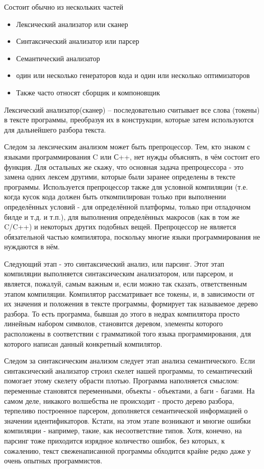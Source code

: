 \documentclass{article}
\begin{document}
Состоит обычно из нескольких частей

\begin{itemize}
    \item Лексический анализатор или сканер
    \item Синтаксический анализатор или парсер
    \item Семантический анализатор
    \item один или несколько генераторов кода и один или несколько оптимизаторов
    \item Также часто относят сборщик и компоновщик
\end{itemize}

Лексический анализатор(сканер) -- последовательно считывает все слова (токены) в тексте программы, преобразуя их в конструкции, которые затем используются для дальнейшего разбора текста.

Следом за лексическим анализом может быть препроцессор. Тем, кто знаком с языками программирования C или С++, нет нужды объяснять, в чём состоит его функция. Для остальных же скажу, что основная задача препроцессора - это замена одних лексем другими, которые были заранее определены в тексте программы. Используется препроцессор также для условной компиляции (т.е. когда кусок кода должен быть откомпилирован только при выполнении определённых условий - для определённой платформы, только при отладочном билде и т.д. и т.п.), для выполнения определённых макросов (как в том же C/C++) и некоторых других подобных вещей. Препроцессор не является обязательной частью компилятора, поскольку многие языки программирования не нуждаются в нём.

Следующий этап - это синтаксический анализ, или парсинг. Этот этап компиляции выполняется синтаксическим анализатором, или парсером, и является, пожалуй, самым важным и, если можно так сказать, ответственным этапом компиляции. Компилятор рассматривает все токены, и, в зависимости от их значения и положения в тексте программы, формирует так называемое дерево разбора. То есть программа, бывшая до этого в недрах компилятора просто линейным набором символов, становится деревом, элементы которого расположены в соответствии с грамматикой того языка программирования, для которого написан данный конкретный компилятор.

Следом за синтаксическим анализом следует этап анализа семантического. Если синтаксический анализатор строил скелет нашей программы, то семантический помогает этому скелету обрасти плотью. Программа наполняется смыслом: переменные становятся переменными, объекты - объектами, а баги - багами. На самом деле, никакого волшебства не происходит - просто дерево разбора, терпеливо построенное парсером, дополняется семантической информацией о значении идентификаторов. Кстати, на этом этапе возникают и многие ошибки компиляции - например, такие, как несоответствие типов. Хотя, конечно, на парсинг тоже приходится изрядное количество ошибок, без которых, к сожалению, текст свеженаписанной программы обходится крайне редко даже у очень опытных программистов.
\end{document}

